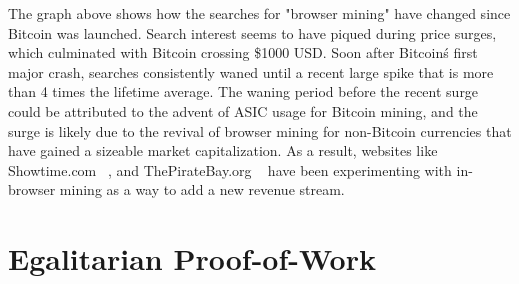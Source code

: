 The graph above shows how the searches for "browser mining" have changed since Bitcoin was launched. Search interest seems to have piqued during price surges, which culminated with Bitcoin crossing \$1000 USD. Soon after Bitcoin\'s first major crash, searches consistently waned until a recent large spike that is more than 4 times the lifetime average. The waning period before the recent surge could be attributed to the advent of ASIC usage for Bitcoin mining, and the surge is likely due to the revival of browser mining for non-Bitcoin currencies that have gained a sizeable market capitalization. As a result, websites like Showtime.com ~\cite{showtimehive}, and ThePirateBay.org ~\cite{piratesbayhive} have been experimenting with in-browser mining as a way to add a new revenue stream.

\section{Egalitarian Proof-of-Work}

